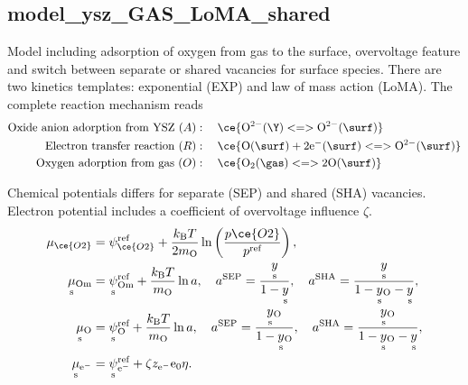 \documentclass{article}
\numberwithin{equation}{section}
\newcommand{\us}[1]{\underset{\textrm{s}}{#1}{}}
\def\e{\textrm{e}}
\def\kB{k_\mathrm{B}}
\def\Ox{\mathrm{O}}
\def\Om{\mathrm{Om}}
\newcommand{\OO}{{\ce{O2}}}
\def\yOs{{\us y_\textrm{O}}}
\def\yAs{{\us y}}
\def\pO2{{p\OO}}
\def\e{{\textrm{e}^-}}
\def\efac{\zeta}
\def\REF{\textrm{ref}}
\begin{document}
\subsection{model\_ysz\_GAS\_LoMA\_shared}
Model including adsorption of oxygen  from gas to the surface, overvoltage feature and switch between separate or shared vacancies for surface species. There are two kinetics templates: exponential (EXP) and law of mass action (LoMA). The complete reaction mechanism reads
\begin{subequations}
\begin{align}
\mathrm{Oxide \ anion \ adorption \ from \ YSZ} \ (A) &: \quad 
\ce{\Ox^{2-}(\Y) <=> \Ox^{2-}(\surf)}
\\
\mathrm{Electron \ transfer \ reaction}\ (R) &: \quad 
\ce{\textrm{O}(\surf) +  2\textrm{e}^-(\surf) <=> \Ox^{2-}(\surf)}
\\
\mathrm{Oxygen \ adorption \ from \ gas}\  (O) &: \quad 
\ce{\Ox_2({\gas}) <=> 2 \Ox(\surf)}
\end{align} \label{eq:LoMA_shared_mechanism}
\end{subequations}

Chemical potentials differs for separate (SEP) and shared (SHA) vacancies. Electron potential includes a coefficient of overvoltage influence $\efac$.
\begin{subequations}
\begin{align}
\mu_{\OO} &= \psi_{\OO}^\REF + \frac{\kB T}{2 m_\Ox}\ln 
\left( 
    \frac{\pO2}{p^\REF} 
\right),
\\
\us \mu_{\Om} 
&= 
\us \psi_{\Om}^\REF 
+ 
\frac{\kB T}{m_\Ox} \ln a,
\quad
a^{\textrm{SEP}} = \frac{\yAs}{1-\yAs},
\quad
a^{\textrm{SHA}} = \frac{\yAs}{1- \yOs - \yAs},
\\
\us \mu_{\Ox} 
&= 
\us \psi_{\Ox}^\REF 
+ 
\frac{\kB T}{m_\Ox} \ln a,
\quad
a^{\textrm{SEP}} = \frac{\yOs}{1-\yOs},
\quad
a^{\textrm{SHA}} = \frac{\yOs}{1- \yOs - \yAs},
\\
\us \mu_{\e} 
&=
\us \psi_{\e}^\REF
+
\efac z_\e \text{e}_0 \eta. \label{eq:overvoltage_intro}
\end{align}
\end{subequations}
\end{document}
